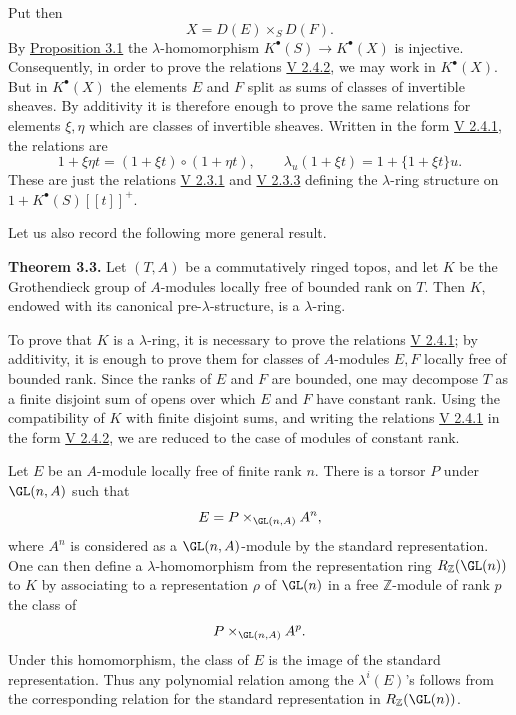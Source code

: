 Put then
\[
  X=D(E)\times_S D(F).
\]
By \hyperlink{sga6.e06.prop.3-1}{Proposition 3.1} the \(\lambda\)-homomorphism \(K^\bullet(S)\to K^\bullet(X)\) is injective. Consequently, in order to prove the relations \hyperlink{sga6.e05.eq.2-4-2}{V 2.4.2}, we may work in \(K^\bullet(X)\). But in \(K^\bullet(X)\) the elements \(E\) and \(F\) split as sums of classes of invertible sheaves. By additivity it is therefore enough to prove the same relations for elements \(\xi,\eta\) which are classes of invertible sheaves. Written in the form \hyperlink{sga6.e05.eq.2-4-1}{V 2.4.1}, the relations are
\[
  1+\xi\eta t=(1+\xi t)\circ(1+\eta t),
  \qquad
  \lambda_u(1+\xi t)=1+\{1+\xi t\}u.
\]
These are just the relations \hyperlink{sga6.e05.eq.2-3-1}{V 2.3.1} and \hyperlink{sga6.e05.eq.2-3-3}{V 2.3.3} defining the \(\lambda\)-ring structure on \(1+K^\bullet(S)[[t]]^+\).

Let us also record the following more general result.

\textbf{Theorem 3.3.} Let \((T,A)\) be a commutatively ringed topos, and let \(K\) be the Grothendieck group of \(A\)-modules locally free of bounded rank on \(T\). Then \(K\), endowed with its canonical pre-\(\lambda\)-structure, is a \(\lambda\)-ring.

To prove that \(K\) is a \(\lambda\)-ring, it is necessary to prove the relations \hyperlink{sga6.e05.eq.2-4-1}{V 2.4.1}; by additivity, it is enough to prove them for classes of \(A\)-modules \(E,F\) locally free of bounded rank. Since the ranks of \(E\) and \(F\) are bounded, one may decompose \(T\) as a finite disjoint sum of opens over which \(E\) and \(F\) have constant rank. Using the compatibility of \(K\) with finite disjoint sums, and writing the relations \hyperlink{sga6.e05.eq.2-4-1}{V 2.4.1} in the form \hyperlink{sga6.e05.eq.2-4-2}{V 2.4.2}, we are reduced to the case of modules of constant rank.

Let \(E\) be an \(A\)-module locally free of finite rank \(n\). There is a torsor \(P\) under \(\GL(n,A)\) such that
\[
  E=P\times_{\GL(n,A)} A^n,
\]
where \(A^n\) is considered as a \(\GL(n,A)\)-module by the standard representation. One can then define a \(\lambda\)-homomorphism from the representation ring \(R_{\mathbb Z}(\GL(n))\) to \(K\) by associating to a representation \(\rho\) of \(\GL(n)\) in a free \(\mathbb Z\)-module of rank \(p\) the class of
\[
  P\times_{\GL(n,A)} A^p.
\]
Under this homomorphism, the class of \(E\) is the image of the standard representation. Thus any polynomial relation among the \(\lambda^i(E)\)'s follows from the corresponding relation for the standard representation in \(R_{\mathbb Z}(\GL(n))\).

